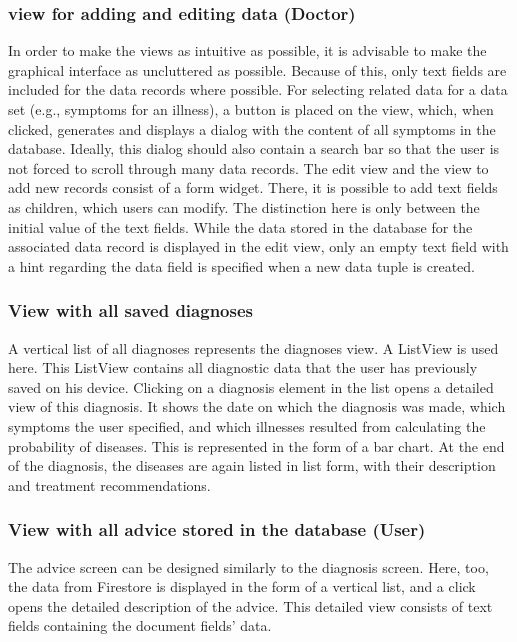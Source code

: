 \subsubsection{\textbf{view for adding and editing data (Doctor)}}
In order to make the views as intuitive as possible, it is advisable to make the graphical interface as uncluttered as possible. Because of this, only text fields are included for the data records where possible. For selecting related data for a data set (e.g., symptoms for an illness), a button is placed on the view, which, when clicked, generates and displays a dialog with the content of all symptoms in the database. Ideally, this dialog should also contain a search bar so that the user is not forced to scroll through many data records. The edit view and the view to add new records consist of a form widget. There, it is possible to add text fields as children, which users can modify. The distinction here is only between the initial value of the text fields. While the data stored in the database for the associated data record is displayed in the edit view, only an empty text field with a hint regarding the data field is specified when a new data tuple is created.

\subsubsection{\textbf{View with all saved diagnoses}}
A vertical list of all diagnoses represents the diagnoses view. A ListView is used here. This ListView contains all diagnostic data that the user has previously saved on his device. Clicking on a diagnosis element in the list opens a detailed view of this diagnosis. It shows the date on which the diagnosis was made, which symptoms the user specified, and which illnesses resulted from calculating the probability of diseases. This is represented in the form of a bar chart. At the end of the diagnosis, the diseases are again listed in list form, with their description and treatment recommendations.

\subsubsection{\textbf{View with all advice stored in the database (User) }}
The advice screen can be designed similarly to the diagnosis screen. Here, too, the data from Firestore is displayed in the form of a vertical list, and a click opens the detailed description of the advice. This detailed view consists of text fields containing the document fields' data.

